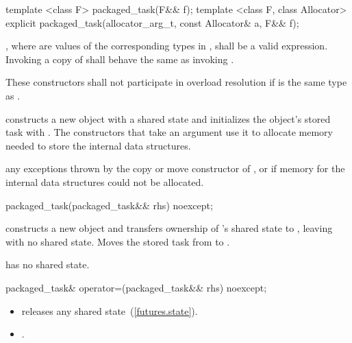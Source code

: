 %
\begin{itemdecl}
template <class F>
  packaged_task(F&& f);
template <class F, class Allocator>
  explicit packaged_task(allocator_arg_t, const Allocator& a, F&& f);
\end{itemdecl}

\begin{itemdescr}
\pnum
\requires
{}, where  are values
of the corresponding types in , shall be a valid expression. Invoking
a copy of  shall behave the same as invoking .

\pnum
\remarks
These constructors shall not participate in overload resolution if 
is the same type as .

\pnum
\effects constructs a new  object with a shared state and
initializes the object's stored task with . The constructors that
take an  argument use it to allocate memory needed to store the
internal data structures.

\pnum
\throws any exceptions thrown by the copy or move constructor of , or
 if memory for the internal data structures could not be
allocated.
\end{itemdescr}

%
\begin{itemdecl}
packaged_task(packaged_task&& rhs) noexcept;
\end{itemdecl}

\begin{itemdescr}
\pnum
\effects constructs a new  object and transfers ownership of
's shared state to , leaving  with no
shared state. Moves the stored task from  to .

\pnum
\postcondition {} has no shared state.
\end{itemdescr}

%
%
\begin{itemdecl}
packaged_task& operator=(packaged_task&& rhs) noexcept;
\end{itemdecl}

\begin{itemdescr}
\pnum
\effects

\begin{itemize}
\item
releases any shared state~(\ref{futures.state}).

\item
{}.
\end{itemize}
\end{itemdescr}

